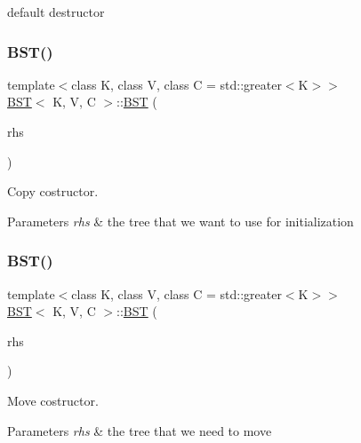 default destructor \mbox{\label{classBST_a447d9506675de51dbf56403fa2b910e8}} 
\subsubsection{\texorpdfstring{B\+S\+T()}{BST()}\hspace{0.1cm}{\footnotesize\ttfamily [2/3]}}
{\footnotesize\ttfamily template$<$class K, class V, class C = std\+::greater$<$\+K$>$$>$ \\
\hyperlink{classBST}{B\+ST}$<$ K, V, C $>$\+::\hyperlink{classBST}{B\+ST} (\begin{DoxyParamCaption}\item[{const \hyperlink{classBST}{B\+ST}$<$ K, V, C $>$ \&}]{rhs }\end{DoxyParamCaption})\hspace{0.3cm}{\ttfamily [inline]}}



Copy costructor. 


\begin{DoxyParams}{Parameters}
{\em rhs} & the tree that we want to use for initialization \\
\hline
\end{DoxyParams}
\mbox{\label{classBST_af590b11504c8725c0c0b983ccda10517}} 
\subsubsection{\texorpdfstring{B\+S\+T()}{BST()}\hspace{0.1cm}{\footnotesize\ttfamily [3/3]}}
{\footnotesize\ttfamily template$<$class K, class V, class C = std\+::greater$<$\+K$>$$>$ \\
\hyperlink{classBST}{B\+ST}$<$ K, V, C $>$\+::\hyperlink{classBST}{B\+ST} (\begin{DoxyParamCaption}\item[{\hyperlink{classBST}{B\+ST}$<$ K, V, C $>$ \&\&}]{rhs }\end{DoxyParamCaption})\hspace{0.3cm}{\ttfamily [inline]}}



Move costructor. 


\begin{DoxyParams}{Parameters}
{\em rhs} & the tree that we need to move \\
\hline
\end{DoxyParams}


